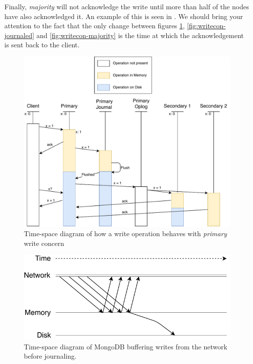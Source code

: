 Finally, \textit{majority} will not acknowledge the write until more than half of the nodes have also acknowledged it. An example of this is seen in . We should bring your attention to the fact that the only change between figures \ref{fig:writecon-primary}, \ref{fig:writecon-journaled} and \ref{fig:writecon-majority} is the time at which the acknowledgement is sent back to the client.

\begin{figure}
    \centering        
    \includegraphics{images/PrimaryWriteConcern.pdf}
    \caption{Time-space diagram of how a write operation behaves with \textit{primary} write concern}
    \label{fig:writecon-primary}
\end{figure}

\begin{figure}
    \centering
    \includegraphics[width=\textwidth]{images/Buffering.pdf}
    \caption{Time-space diagram of MongoDB buffering writes from the network before journaling.}
    \label{fig:journal_buffer}
\end{figure}

